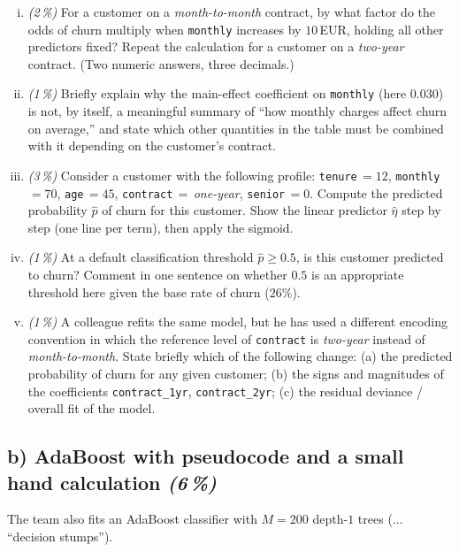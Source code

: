 \documentclass[11pt,a4paper]{article}
\newcommand{\subpoints}[1]{\textit{(#1\,\%)}}
\begin{document}
\begin{enumerate}[(i)]
  \item \subpoints{2} For a customer on a \emph{month-to-month} contract, by what factor do the odds of churn multiply when \texttt{monthly} increases by $10$\,EUR, holding all other predictors fixed? Repeat the calculation for a customer on a \emph{two-year} contract. (Two numeric answers, three decimals.)
  \item \subpoints{1} Briefly explain why the main-effect coefficient on \texttt{monthly} (here $0.030$) is not, by itself, a meaningful summary of ``how monthly charges affect churn on average,'' and state which other quantities in the table must be combined with it depending on the customer's contract.
  \item \subpoints{3} Consider a customer with the following profile: \texttt{tenure}\,$=12$, \texttt{monthly}\,$=70$, \texttt{age}\,$=45$, \texttt{contract}\,$=$\,\emph{one-year}, \texttt{senior}\,$=0$. Compute the predicted probability $\hat p$ of churn for this customer. Show the linear predictor $\hat\eta$ step by step (one line per term), then apply the sigmoid.
  \item \subpoints{1} At a default classification threshold $\hat p \ge 0.5$, is this customer predicted to churn? Comment in one sentence on whether $0.5$ is an appropriate threshold here given the base rate of churn ($26\%$).
  \item \subpoints{1} A colleague refits the same model, but he has used a different encoding convention in which the reference level of \texttt{contract} is \emph{two-year} instead of \emph{month-to-month}. State briefly which of the following change: (a) the predicted probability of churn for any given customer; (b) the signs and magnitudes of the coefficients \texttt{contract\_1yr}, \texttt{contract\_2yr}; (c) the residual deviance / overall fit of the model.
\end{enumerate}

\subsection*{b) AdaBoost with pseudocode and a small hand calculation \subpoints{6}}

The team also fits an AdaBoost classifier with $M=200$ depth-$1$ trees ($\ldots$ ``decision stumps'').
\end{document}
